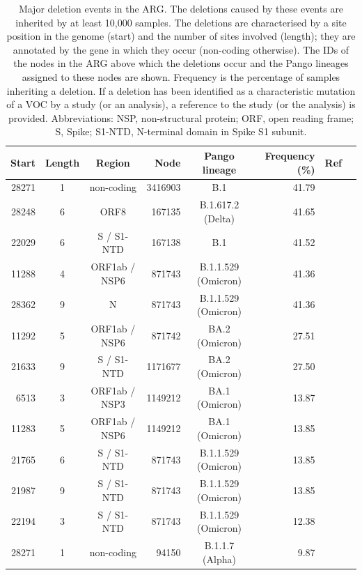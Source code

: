 \documentclass[12pt]{article}
\begin{document}
\begin{table}[h]
\centering
\caption{
Major deletion events in the ARG.
The deletions caused by these events
are inherited by at least 10,000 samples.
The deletions are characterised by
a site position in the genome (start) and
the number of sites involved (length);
they are annotated by the gene in which they occur
(non-coding otherwise).
The IDs of the nodes in the ARG
above which the deletions occur and
the Pango lineages assigned to these nodes are shown.
Frequency is the percentage of samples inheriting a deletion.
If a deletion has been identified
as a characteristic mutation of a VOC
by a study (or an analysis),
a reference to the study (or the analysis) is provided.
Abbreviations: NSP, non-structural protein;
ORF, open reading frame;
S, Spike;
S1-NTD, N-terminal domain in Spike S1 subunit.
}
\label{tab:major_dels}
\begin{tabular}{rccrcrrc}
\toprule
Start & Length & Region & Node & Pango lineage & Frequency (\%) & Ref\\
\midrule
28271 & 1 & non-coding & 3416903 & B.1 & 41.79 &  \\
28248 & 6 & ORF8 & 167135 & B.1.617.2 (Delta) & 41.65 & \cite{Stern2021} \\
22029 & 6 & S / S1-NTD & 167138 & B.1 & 41.52 &  \\
11288 & 4 & ORF1ab / NSP6 & 871743 & B.1.1.529 (Omicron) & 41.36 &  \\
28362 & 9 & N & 871743 & B.1.1.529 (Omicron) & 41.36 & \cite{RambautOmicron2021} \\
11292 & 5 & ORF1ab / NSP6 & 871742 & BA.2 (Omicron) & 27.51 &  \\
21633 & 9 & S / S1-NTD & 1171677 & BA.2 (Omicron) & 27.50 & \cite{RambautOmicron2021} \\
6513 & 3 & ORF1ab / NSP3 & 1149212 & BA.1 (Omicron) & 13.87 & \cite{RambautOmicron2021} \\
11283 & 5 & ORF1ab / NSP6 & 1149212 & BA.1 (Omicron) & 13.85 &  \\
21765 & 6 & S / S1-NTD & 871743 & B.1.1.529 (Omicron) & 13.85 &  \\
21987 & 9 & S / S1-NTD & 871743 & B.1.1.529 (Omicron) & 13.85 &  \\
22194 & 3 & S / S1-NTD & 871743 & B.1.1.529 (Omicron) & 12.38 &  \\
28271 & 1 & non-coding & 94150 & B.1.1.7 (Alpha) & 9.87 &  \\

\end{tabular}
\end{table}
\end{document}
